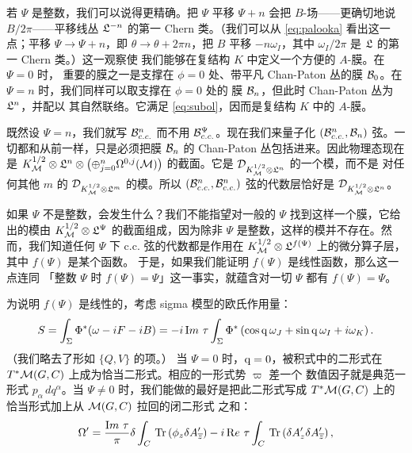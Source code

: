 若 $\Psi$ 是整数，我们可以说得更精确。把 $\Psi$ 平移
$\Psi+n$ 会把 $B$-场——更确切地说 $B/2\pi$——平移线丛
${{{\frak L}}}^{-n}$ 的第一 Chern 类。（我们可以从
\eqref{eq:palooka} 看出这一点；平移 $\Psi\to \Psi+n$，即
$\theta\to\theta+2\pi n$，把 $B$ 平移 $-n\omega_I$，其中
$\omega_I/2\pi$ 是 ${\frak L}$ 的第一 Chern 类。）这一观察使
我们能够在复结构 $K$ 中定义一个方便的 $A$-膜。在 $\Psi=0$ 时，
重要的膜之一是支撑在 $\phi=0$ 处、带平凡 Chan-Paton 丛的膜
${\cal B}_0$。在 $\Psi=n$ 时，我们同样可以取支撑在 $\phi=0$ 处的
膜 ${\cal B}_n$，但此时 Chan-Paton 丛为 ${{{\frak L}}}^n$，并配以
其自然联络。它满足 \eqref{eq:subol}，因而是复结构 $K$ 中的
$A$-膜。

既然设 $\Psi=n$，我们就写 ${\cal B}_{c.c.}^n$ 而不用
${\cal B}_{c.c.}^\Psi$。现在我们来量子化 $({\cal
B}_{c.c.}^n,{\cal B}_n)$ 弦。一切都和从前一样，只是必须把膜
${\cal B}_n$ 的 Chan-Paton 丛包括进来。因此物理态现在是
$K_{\EUM}^{1/2}\otimes {\frak
L}^n\otimes\left(\oplus_{j=0}^n\Omega^{0,j}(\M)\right)$ 的截面。它是
${\cal D}_{K_{\EUM}^{1/2}\otimes {{{\frak L}}}^n}$ 的一个模，而不是
对任何其他 $m$ 的
${\cal D}_{K_{\EUM}^{1/2}\otimes {{{\frak L}}}^m}$ 的模。所以
$({\cal B}_{c.c.}^n,{\cal B}_{c.c.}^n)$ 弦的代数层恰好是
${\cal D}_{K_{\EUM}^{1/2}\otimes {{{\frak L}}}^n}$。

如果 $\Psi$ 不是整数，会发生什么？我们不能指望对一般的 $\Psi$
找到这样一个膜，它给出的模由
$K_{\EUM}^{1/2}\otimes {{{\frak L}}}^\Psi$ 的截面组成，因为除非
$\Psi$ 是整数，这样的模并不存在。然而，我们知道任何 $\Psi$ 下
c.c. 弦的代数都是作用在 ${K_{\EUM}^{1/2}}\otimes
{\frak L}^{f(\Psi)}$ 上的微分算子层，其中 $f(\Psi)$ 是某个函数。
于是，如果我们能证明 $f(\Psi)$ 是线性函数，那么这一点连同
「整数 $\Psi$ 时 $f(\Psi)=\Psi$」这一事实，就蕴含对一切 $\Psi$
都有 $f(\Psi)=\Psi$。

为说明 $f(\Psi)$ 是线性的，考虑 sigma 模型的欧氏作用量：%
\setcounter{equation}{37}
\begin{equation}\label{eq:cumber}
S=\int_\Sigma\Phi^*
(\omega-iF-iB)=-i\,\Im\tau \int_\Sigma \Phi^*\left(\cos{\eurm q}\,
\omega_J+\sin{\eurm q}\, \omega_I + i\omega_K\right).
\end{equation}
 （我们略去了形如 $\{Q,V\}$ 的项。）
 当 $\Psi=0$ 时，${\eurm q}=0$，被积式中的二形式在
$T^*\cM(G,C)$ 上成为恰当二形式。相应的一形式势 $\varpi$ 差一个
数值因子就是典范一形式 $p_\alpha\, dq^\alpha$。当
$\Psi\neq 0$ 时，我们能做的最好是把此二形式写成
$T^*\cM(G,C)$ 上的恰当形式加上从 $\cM(G,C)$ 拉回的闭二形式
之和：%
\setcounter{equation}{38}
\begin{equation}\label{eq:hexo}
\Omega'={{\Im\tau}\over
\pi}\delta\int_C \,\Tr\left(\phi_z \delta A'_\bz\right)-
i\,\Re\tau \int_C\, \Tr\left(\delta A'_z\delta A'_\bz\right),
\end{equation}

